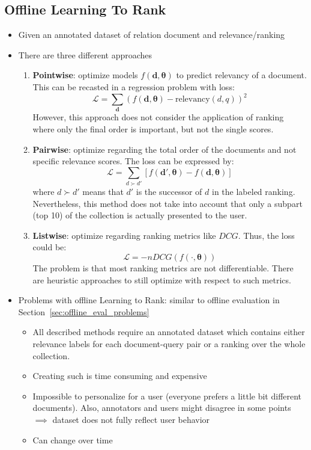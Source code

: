 \subsection{Offline Learning To Rank}
\begin{itemize}
	\item Given an annotated dataset of relation document and relevance/ranking
	\item There are three different approaches
	\begin{enumerate}
		\item \textbf{Pointwise}: optimize models $f(\bm{d},\bm{\theta})$ to predict relevancy of a document. This can be recasted in a regression problem with loss:
		$$\mathcal{L}=\sum_{\bm{d}} \left(f(\bm{d},\bm{\theta}) - \text{relevancy}(d,q)\right)^2$$
		However, this approach does not consider the application of ranking where only the final order is important, but not the single scores.
		\item \textbf{Pairwise}: optimize regarding the total order of the documents and not specific relevance scores. The loss can be expressed by:
		$$\mathcal{L}=\sum_{d\succ d'}\left[f(\bm{d'},\bm{\theta}) - f(\bm{d},\bm{\theta})\right]$$ 
		where $d\succ d'$ means that $d'$ is the successor of $d$ in the labeled ranking. Nevertheless, this method does not take into account that only a subpart (top 10) of the collection is actually presented to the user.
		\item \textbf{Listwise}: optimize regarding ranking metrics like $DCG$. Thus, the loss could be:
		$$\mathcal{L} = -nDCG(f(\cdot,\bm{\theta}))$$
		The problem is that most ranking metrics are not differentiable. There are heuristic approaches to still optimize with respect to such metrics. 
	\end{enumerate}
	\item Problems with offline Learning to Rank: similar to offline evaluation in Section~\ref{sec:offline_eval_problems}
	\begin{itemize}
		\item All described methods require an annotated dataset which contains either relevance labels for each document-query pair or a ranking over the whole collection.
		\item Creating such is time consuming and expensive
		\item Impossible to personalize for a user (everyone prefers a little bit different documents). Also, annotators and users might disagree in some points $\implies$ dataset does not fully reflect user behavior
		\item Can change over time
	\end{itemize}
\end{itemize}
